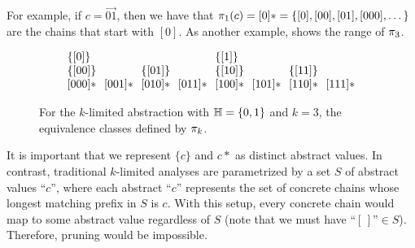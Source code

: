 For example, if $c = \vec{01}$,
then we have that $\pi_1(c) = [0]* = \{ [0], [00], [01], [000], \dots \}$
are the chains that start with $[0]$.
As another example,  shows the range of $\pi_3$.

\begin{figure}
\[
\arraycolsep=3.5pt
\begin{array}{llllllll}
\{\vec{0}\}    &            &              &            & \{\vec{1}\} \\
\{\vec{00}\}   &            & \{\vec{01}\} &            & \{\vec{10}\} &            & \{\vec{11}\} \\
\vec{000}*     & \vec{001}* & \vec{010}*   & \vec{011}* & \vec{100}*   & \vec{101}* & \vec{110}* & \vec{111}*
\end{array}
\]
\caption{\label{fig:repeatingExample} For the $k$-limited abstraction
with ${\mathbb H} = \{ 0, 1 \}$ and $k = 3$, the equivalence classes defined by $\pi_k$.
}
\end{figure}

It is important that we represent $\{c\}$ and $c*$ as distinct abstract values.
In contrast, traditional $k$-limited analyses are parametrized by a set $S$ of abstract values ``$c$'',
where each abstract ``$c$'' represents the set of concrete chains whose longest
matching prefix in $S$ is $c$.
With this setup,
every concrete chain would map to some abstract value regardless of $S$
(note that we must have $\text{``$[\,]$''} \in S$).
Therefore, pruning would be impossible.



